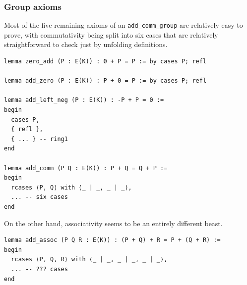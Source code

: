\subsubsection{Group axioms}

Most of the five remaining axioms of an \texttt{add\_comm\_group} are relatively easy to prove, with commutativity being split into six cases that are relatively straightforward to check just by unfolding definitions.

\begin{lstlisting}[frame=single]
lemma zero_add (P : E(K)) : 0 + P = P := by cases P; refl

lemma add_zero (P : E(K)) : P + 0 = P := by cases P; refl

lemma add_left_neg (P : E(K)) : -P + P = 0 :=
begin
  cases P,
  { refl },
  { ... } -- ring1
end

lemma add_comm (P Q : E(K)) : P + Q = Q + P :=
begin
  rcases ⟨P, Q⟩ with ⟨_ | _, _ | _⟩,
  ... -- six cases
end
\end{lstlisting}

On the other hand, associativity seems to be an entirely different beast.

\begin{lstlisting}[frame=single]
lemma add_assoc (P Q R : E(K)) : (P + Q) + R = P + (Q + R) :=
begin
  rcases ⟨P, Q, R⟩ with ⟨_ | _, _ | _, _ | _⟩,
  ... -- ??? cases
end
\end{lstlisting}

\pagebreak

